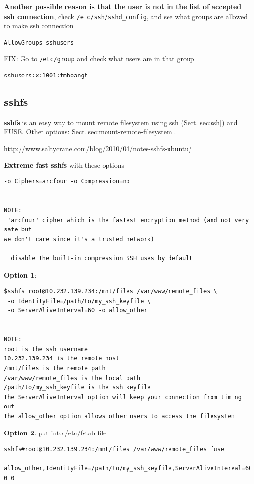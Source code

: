 {\bf Another possible reason is that the user is not in the list of accepted
ssh connection}, check  \verb!/etc/ssh/sshd_config!, and see what groups are
allowed to make ssh connection
\begin{verbatim}
AllowGroups sshusers
\end{verbatim}
FIX: Go to \verb!/etc/group! and check what users are in that group
\begin{verbatim}
sshusers:x:1001:tmhoangt
\end{verbatim}


\subsection{sshfs}
\label{sec:sshfs}

{\bf sshfs} is an easy way to mount remote filesystem using ssh
(Sect.\ref{sec:ssh}) and FUSE. Other options:
Sect.\ref{sec:mount-remote-filesystem}.

\url{http://www.saltycrane.com/blog/2010/04/notes-sshfs-ubuntu/}

{\bf Extreme fast sshfs} with these options
\begin{verbatim}
-o Ciphers=arcfour -o Compression=no


NOTE:
 'arcfour' cipher which is the fastest encryption method (and not very safe but
we don't care since it's a trusted network)

  disable the built-in compression SSH uses by default
\end{verbatim}
	 

{\bf Option 1}:
\begin{verbatim}
$sshfs root@10.232.139.234:/mnt/files /var/www/remote_files \
 -o IdentityFile=/path/to/my_ssh_keyfile \
 -o ServerAliveInterval=60 -o allow_other


NOTE: 
root is the ssh username
10.232.139.234 is the remote host
/mnt/files is the remote path
/var/www/remote_files is the local path
/path/to/my_ssh_keyfile is the ssh keyfile
The ServerAliveInterval option will keep your connection from timing out.
The allow_other option allows other users to access the filesystem
\end{verbatim}


{\bf Option 2}: put into /etc/fstab file
\begin{verbatim}
sshfs#root@10.232.139.234:/mnt/files /var/www/remote_files fuse
 allow_other,IdentityFile=/path/to/my_ssh_keyfile,ServerAliveInterval=60 0 0

\end{verbatim}




